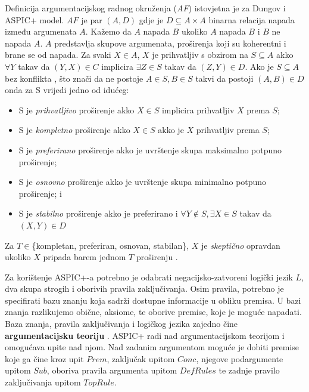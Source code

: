 Definicija argumentacijskog radnog okruženja (\emph{AF}) istovjetna je za 
Dungov i ASPIC+ model. 
$AF$ je par $(A, D)$ gdje je $D \subseteq A \times A$ binarna relacija napada 
između argumenata $A$. 
Kažemo da $A$ napada $B$ ukoliko $A$ napada $B$ i $B$ ne napada $A$. $A$ 
predstavlja skupove argumenata, proširenja 
koji su koherentni i brane se od napada. 
Za svaki $X \in A$, $X$ je prihvatljiv s obzirom na $S \subseteq A$ akko
$\forall Y$ takav da $(Y, X) \in C$ implicira $\exists Z \in S$ takav da
$(Z, Y) \in D$. Ako je $S \subseteq A$ bez konflikta , što znači 
da ne postoje $A \in S, B \in S$ takvi da postoji $(A, B) \in D$ onda za S vrijedi
jedno od idućeg:
\begin{itemize}
    \item S je \emph{prihvatljivo} proširenje akko $X \in S$ implicira prihvatljiv $X$ prema $S$;
    \item S je \emph{kompletno} proširenje akko $X \in S$ akko je $X$ prihvatljiv prema $S$;
    \item S je \emph{preferirano} proširenje akko je uvrštenje skupa maksimalno potpuno proširenje; 
    \item S je \emph{osnovno} proširenje akko je uvrštenje skupa minimalno potpuno proširenje; i
    \item S je \emph{stabilno} proširenje akko je preferirano i $\forall Y \notin S, \exists X \in S$ takav da
        $(X, Y) \in D$
\end{itemize}
Za $T \in $\{kompletan, preferiran, osnovan, stabilan\}, $X$ je
\emph{skeptično} opravdan ukoliko $X$ pripada barem jednom $T$ proširenju
\citep{modgil2014aspic+}. 

Za korištenje ASPIC+-a potrebno je odabrati negacijsko-zatvoreni logički jezik $L$,
dva skupa strogih  i oborivih  pravila
zaključivanja. 
Osim pravila, potrebno je specifirati bazu znanju 
 koja sadrži dostupne informacije u obliku premisa. 
U bazi znanja razlikujemo obične, aksiome, te oborive premise, koje je moguće
napadati. Baza znanja, pravila zaključivanja i logičkog jezika
zajedno čine \textbf{argumentacijsku teoriju} .
ASPIC+ radi nad argumentacijskom teorijom i omogućava upite nad njom. 
Nad zadanim argumentom moguće je dobiti premise koje ga čine kroz
upit $Prem$, zaključak upitom $Conc$, 
njegove podargumente upitom $Sub$, oboriva pravila argumenta upitom $DefRules$ te
zadnje pravilo zaključivanja upitom $TopRule$. 

